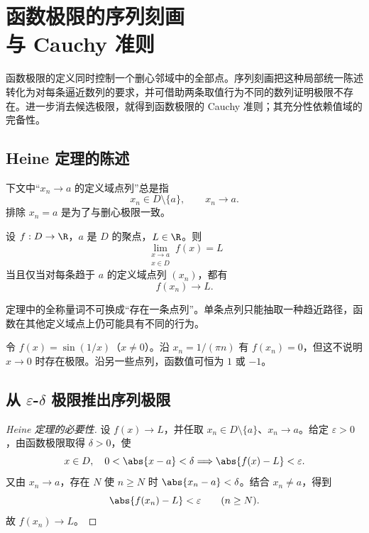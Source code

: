 \chapter[函数极限的序列刻画与 Cauchy 准则]{函数极限的序列刻画\\与 Cauchy 准则}
\label{chap:heine-cauchy}

\begin{chapterguide}
函数极限的定义同时控制一个删心邻域中的全部点。序列刻画把这种局部统一陈述转化为对每条逼近数列的要求，并可借助两条取值行为不同的数列证明极限不存在。进一步消去候选极限，就得到函数极限的 Cauchy 准则；其充分性依赖值域的完备性。
\end{chapterguide}

\section{Heine 定理的陈述}

下文中“\(x_n\to a\) 的定义域点列”总是指
\[
 x_n\in D\setminus\{a\},\qquad x_n\to a.
\]
排除 \(x_n=a\) 是为了与删心极限一致。

\begin{theorem}[Heine 定理]
设 \(f:D\to\R\)，\(a\) 是 \(D\) 的聚点，\(L\in\R\)。则
\[
 \lim_{\substack{x\to a\\x\in D}}f(x)=L
\]
当且仅当对每条趋于 \(a\) 的定义域点列 \((x_n)\)，都有
\[
 f(x_n)\to L.
\]
\end{theorem}

定理中的全称量词不可换成“存在一条点列”。单条点列只能抽取一种趋近路径，函数在其他定义域点上仍可能具有不同的行为。

\begin{counterexample}
令 \(f(x)=\sin(1/x)\)（\(x\ne0\)）。沿 \(x_n=1/(\pi n)\) 有 \(f(x_n)=0\)，但这不说明 \(x\to0\) 时存在极限。沿另一些点列，函数值可恒为 \(1\) 或 \(-1\)。
\end{counterexample}

\section{从 \texorpdfstring{\(\varepsilon\)-\(\delta\)}{epsilon-delta} 极限推出序列极限}

\begin{proof}[Heine 定理的必要性]
设 \(f(x)\to L\)，并任取 \(x_n\in D\setminus\{a\}\)、\(x_n\to a\)。给定 \(\varepsilon>0\)，由函数极限取得 \(\delta>0\)，使
\[
 x\in D,\quad0<\abs{x-a}<\delta
 \Longrightarrow\abs{f(x)-L}<\varepsilon.
\]
又由 \(x_n\to a\)，存在 \(N\) 使 \(n\ge N\) 时 \(\abs{x_n-a}<\delta\)。结合 \(x_n\ne a\)，得到
\[
 \abs{f(x_n)-L}<\varepsilon\qquad(n\ge N).
\]
故 \(f(x_n)\to L\)。
\end{proof}

